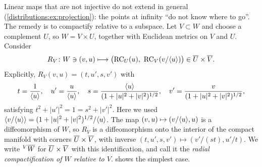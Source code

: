 Linear maps that are not injective do not extend in general
(\cref{distributions:ex:projection}): the points at infinity ``do not know where to go''.
The remedy is to compactify relative to a subspace. Let $V\subset W$ and choose a
complement $U$, so $W=V\times U$, together with Euclidean metrics on $V$ and $U$. Consider
\begin{equation}\label{distributions:eq:relRC}
  R_V\colon W\ni(v,u)\longmapsto\big(\mathrm{RC}_U(u),\ \mathrm{RC}_V(v/\ang{u})\big)
  \in\RC{U}\times\RC{V}.
\end{equation}
Explicitly, $R_V(v,u)=(t,u',s,v')$ with
\[
  t=\frac1{\langle u\rangle},\quad u'=\frac u{\langle u\rangle},\quad
  s=\frac{\langle u\rangle}{(1+|u|^2+|v|^2)^{1/2}},\quad v'=\frac v{(1+|u|^2+|v|^2)^{1/2}},
\]
satisfying $t^2+|u'|^2=1=s^2+|v'|^2$. Here we used
$\langle v/\langle u\rangle\rangle=(1+|u|^2+|v|^2)^{1/2}/\langle u\rangle$. The map $(v,u)\mapsto(v/\langle u\rangle,u)$ is a
diffeomorphism of $W$, so $R_V$ is a diffeomorphism onto the interior of the compact
manifold with corners $\overline{U}\times\overline{V}$, with inverse $(t,u',s,v')\mapsto(v'/(st),u'/t)$.
We write ${}^{V}\overline{W}$ for $\overline{U}\times\overline{V}$ with this identification, and call it the
\emph{radial compactification of $W$ relative to $V$}. 
shows the simplest case.

